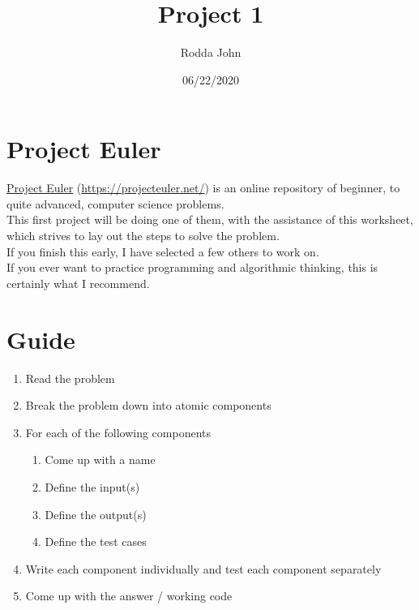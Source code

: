 \documentclass[11pt]{article}
\author{Rodda John}
\date{06/22/2020}
\title{Project 1}
\begin{document}
\maketitle
\setlength\parindent{0pt}

\section{Project Euler}
\label{sec:org079b651}
\href{https://projecteuler.net/}{Project Euler} (\href{https://projecteuler.net/}{https://projecteuler.net/}) is an online repository of beginner, to quite advanced, computer science problems.\\

This first project will be doing one of them, with the assistance of this worksheet, which strives to lay out the steps to solve the problem.\\

If you finish this early, I have selected a few others to work on.\\

If you ever want to practice programming and algorithmic thinking, this is certainly what I recommend.\\
\section{Guide}
\label{sec:orga5ca6b5}
\begin{enumerate}
\item Read the problem\\
\item Break the problem down into atomic components\\
\item For each of the following components\\
\begin{enumerate}
\item Come up with a name\\
\item Define the input(s)\\
\item Define the output(s)\\
\item Define the test cases\\
\end{enumerate}
\item Write each component individually and test each component separately\\
\item Come up with the answer / working code\\
\end{enumerate}
\end{document}
